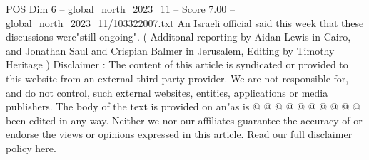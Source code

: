\begin{textsample}{POS Dim 6 – global\_north\_2023\_11 – Score 7.00 – global\_north\_2023\_11/103322007.txt}
An Israeli official said this week that these discussions were"still ongoing". ( Additonal reporting by Aidan Lewis in Cairo, and Jonathan Saul and Crispian Balmer in Jerusalem, Editing by Timothy Heritage ) Disclaimer : The content of this article is syndicated or provided to this website from an external third party provider.
We are not responsible for, and do not control, such external websites, entities, applications or media publishers.
The body of the text is provided on an"as is @ @ @ @ @ @ @ @ @ @ been edited in any way.
Neither we nor our affiliates guarantee the accuracy of or endorse the views or opinions expressed in this article.
Read our full disclaimer policy here.

\end{textsample}
